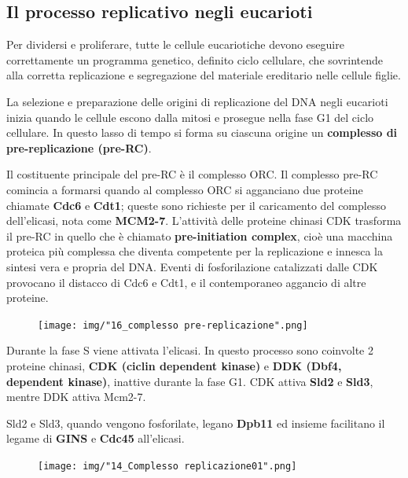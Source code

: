 \documentclass[11pt]{book}
\begin{document}
\subsection{Il processo replicativo negli
eucarioti}\label{il-processo-replicativo-negli-eucarioti}

Per dividersi e proliferare, tutte le cellule eucariotiche devono
eseguire correttamente un programma genetico, definito ciclo cellulare,
che sovrintende alla corretta replicazione e segregazione del materiale
ereditario nelle cellule figlie.

La selezione e preparazione delle origini di replicazione del DNA negli
eucarioti inizia quando le cellule escono dalla mitosi e prosegue nella
fase G1 del ciclo cellulare. In questo lasso di tempo si forma su
ciascuna origine un \textbf{complesso di pre-replicazione (pre-RC)}.

Il costituente principale del pre-RC è il complesso ORC. Il complesso
pre-RC comincia a formarsi quando al complesso ORC si agganciano due
proteine chiamate \textbf{Cdc6} e \textbf{Cdt1}; queste sono richieste
per il caricamento del complesso dell'elicasi, nota come
\textbf{MCM2-7}. L'attività delle proteine chinasi CDK trasforma il
pre-RC in quello che è chiamato \textbf{pre-initiation complex}, cioè
una macchina proteica più complessa che diventa competente per la
replicazione e innesca la sintesi vera e propria del DNA. Eventi di
fosforilazione catalizzati dalle CDK provocano il distacco di Cdc6 e
Cdt1, e il contemporaneo aggancio di altre proteine.

\clearpage

\begin{figure}[htp]
\centering
\texttt{[image: img/"16\_complesso pre-replicazione".png]}
\caption{}
\label{complesso-pre-replicazione}
\end{figure}

Durante la fase S viene attivata l'elicasi. In questo processo sono
coinvolte 2 proteine chinasi, \textbf{CDK (ciclin dependent kinase)} e
\textbf{DDK (Dbf4, dependent kinase)}, inattive durante la fase G1. CDK
attiva \textbf{Sld2} e \textbf{Sld3}, mentre DDK attiva Mcm2-7.

\clearpage

Sld2 e Sld3, quando vengono fosforilate, legano \textbf{Dpb11} ed
insieme facilitano il legame di \textbf{GINS} e \textbf{Cdc45}
all'elicasi.

\begin{figure}[htp]
\centering
\texttt{[image: img/"14\_Complesso replicazione01".png]}
\caption{}
\label{complesso-replicazione01}
\end{figure}
\end{document}

